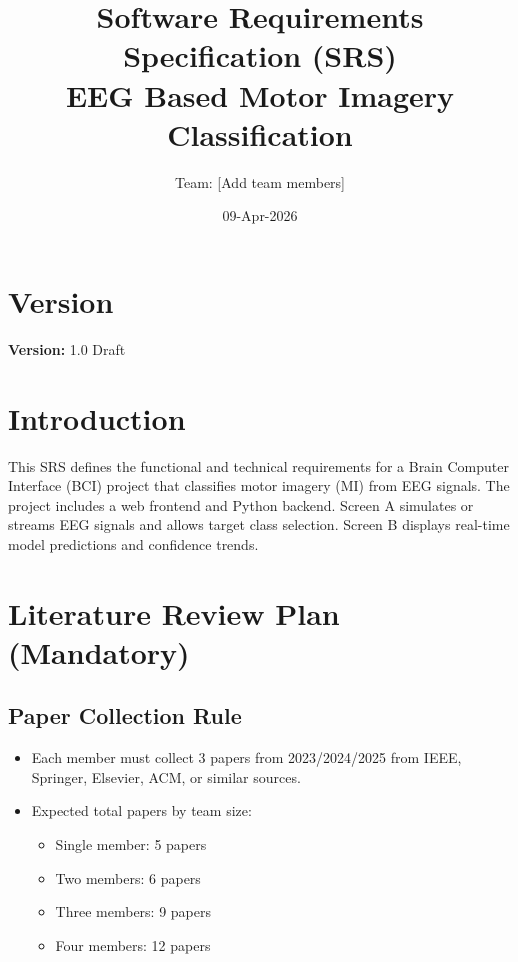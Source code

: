 \documentclass[12pt,a4paper]{article}
\title{Software Requirements Specification (SRS)\\\large EEG Based Motor Imagery Classification}
\author{Team: [Add team members]}
\date{09-Apr-2026}
\begin{document}
\maketitle

\section*{Version}
\textbf{Version:} 1.0 Draft

\section{Introduction}
This SRS defines the functional and technical requirements for a Brain Computer Interface (BCI) project that classifies motor imagery (MI) from EEG signals. The project includes a web frontend and Python backend. Screen A simulates or streams EEG signals and allows target class selection. Screen B displays real-time model predictions and confidence trends.

\section{Literature Review Plan (Mandatory)}
\subsection{Paper Collection Rule}
\begin{itemize}[leftmargin=1.5em]
  \item Each member must collect 3 papers from 2023/2024/2025 from IEEE, Springer, Elsevier, ACM, or similar sources.
  \item Expected total papers by team size:
  \begin{itemize}[leftmargin=1.5em]
    \item Single member: 5 papers
    \item Two members: 6 papers
    \item Three members: 9 papers
    \item Four members: 12 papers
  \end{itemize}
\end{itemize}
\end{document}
